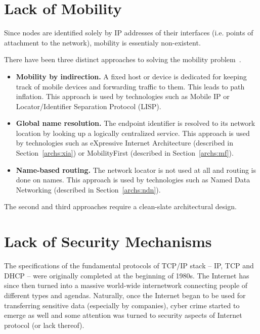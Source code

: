     \section{Lack of Mobility}\label{problems:mobility}

        Since nodes are identified solely by IP addresses of their interfaces (i.e. points of attachment to the network), mobility is essentialy non-existent.

        There have been three distinct approaches to solving the mobility problem~\cite{MobilityFirst}.

        \begin{itemize}
            \item \textbf{Mobility by indirection.} A fixed host or device is dedicated for keeping track of mobile devices and forwarding traffic to them. This leads to path inflation.
            This approach is used by technologies such as Mobile IP or Locator/Identifier Separation Protocol (LISP).
            \item \textbf{Global name resolution.} The endpoint identifier is resolved to its network location by looking up a logically centralized service.
            This approach is used by technologies such as eXpressive Internet Architecture (described in Section~\ref{archs:xia}) or MobilityFirst (described in Section~\ref{archs:mf}).
            \item \textbf{Name-based routing.} The network locator is not used at all and routing is done on names.
            This approach is used by technologies such as Named Data Networking (described in Section~\ref{archs:ndn}).
        \end{itemize}

        The second and third approaches require a clean-slate architectural design.

    \section{Lack of Security Mechanisms}\label{problems:security}

        The specifications of the fundamental protocols of TCP/IP stack -- IP, TCP and DHCP -- were originally completed at the beginning of 1980s. The Internet has since then turned into a massive world-wide internetwork connecting people of different types and agendas. Naturally, once the Internet began to be used for transferring sensitive data (especially by companies), cyber crime started to emerge as well and some attention was turned to security aspects of Internet protocol (or lack thereof).


